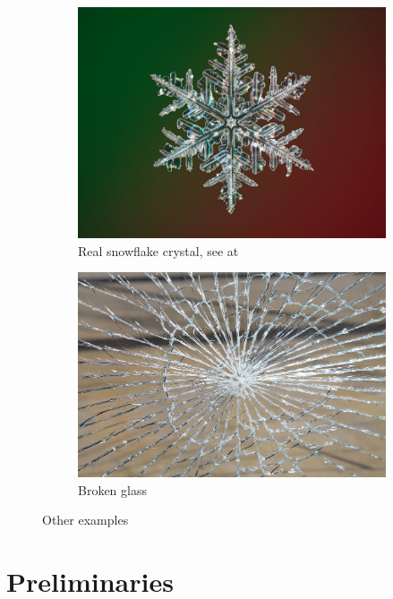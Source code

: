 \documentclass[12pt,a4paper]{scrartcl}
\numberwithin{equation}{subsection}
\newcommand{\1}{\mathbbm{1}}
\numberwithin{equation}{section}
\theoremstyle{definition}
\begin{document}
\begin{figure}
	\begin{subfigure}[b]{.45\textwidth}
		\includegraphics[width=1\linewidth]{images/snowflake.jpg}
		\caption{Real snowflake crystal, see at \cite{snowflake}} 
	\end{subfigure}
	\begin{subfigure}[b]{.45\textwidth}
		\includegraphics[width=.8\linewidth]{images/glass-break.jpg}
		\caption{Broken glass} 
	\end{subfigure}
	\caption{Other examples}
	\label{other}
\end{figure}




\newpage


\section{Preliminaries} \label{prelim}
\end{document}
